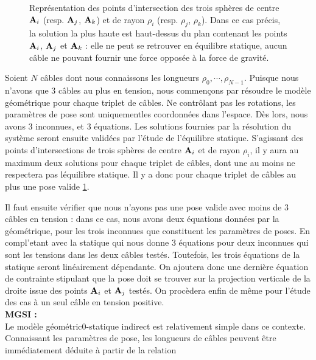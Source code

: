 \begin{figure}[!ht]
  \centering
    \def\svgwidth{.85\linewidth}
      
    \caption{\footnotesize{Repr\'esentation des points d'intersection des 
trois sph\`eres de centre ${\bf A}_i$ (resp. ${\bf A}_j$, ${\bf A}_k$) et de 
rayon $\rho_i$ (resp. $\rho_j$, $\rho_k$). Dans ce cas pr\'ecis, la solution la 
plus haute est haut-dessus du plan contenant les points ${\bf A}_i$, ${\bf 
A}_j$ et ${\bf A}_k$ : elle ne peut se retrouver en \'equilibre statique, 
aucun c\^able ne pouvant fournir une force oppos\'ee \`a la force de 
gravit\'e.}}
\label{intro:fig6b}
\end{figure}

Soient $N$ c\^ables dont nous connaissons les longueurs $\rho_0, \cdots, 
\rho_{N-1}$. Puisque nous n'avons que $3$ c\^ables au plus en tension, nous 
commen\c cons par r\'esoudre le mod\`ele g\'eom\'etrique pour chaque 
triplet de c\^ables. Ne contr\^olant pas les rotations, les param\`etres de 
pose sont uniquementles coordonn\'ees dans l'espace. D\`es lors, nous avons $3$ 
inconnues, et $3$ \'equations. Les solutions fournies par la r\'esolution du 
syst\`eme seront ensuite valid\'ees par l'\'etude de l'\'equilibre statique. 
S'agissant des points d'intersections de trois sph\`eres de centre ${\bf A}_i$ 
et de rayon $\rho_i$, il y aura au maximum deux solutions pour chaque triplet 
de c\^ables, dont une au moins ne respectera pas l\'equilibre statique. Il y a 
donc pour chaque triplet de c\^ables au plus une pose valide \ref{intro:fig6b}.

Il faut ensuite v\'erifier que nous n'ayons pas une pose valide avec moins de 
$3$ c\^ables en tension : dans ce cas, nous avons deux \'equations donn\'ees 
par la g\'eom\'etrique, pour les trois inconnues que constituent les 
param\`etres de poses. En compl'etant avec la statique qui nous donne 3 
\'equations pour deux inconnues qui sont les tensions dans les deux c\^ables 
test\'es. Toutefois, les trois \'equations de la statique seront lin\'eairement 
d\'ependante. On ajoutera donc une derni\`ere \'equation de contrainte 
stipulant que la pose doit se trouver sur la projection verticale de la droite 
issue des points ${\bf A}_i$ et ${\bf A}_j$ test\'es. On proc\`edera enfin de 
m\^eme pour l'\'etude des cas \`a un seul c\^able en tension positive. \\


{\bf MGSI :}\\

Le mod\`ele g\'eom\'etric0-statique indirect est relativement simple dans ce 
contexte. Connaissant les param\`etres de pose, les longueurs de c\^ables 
peuvent \^etre imm\'ediatement d\'eduite \`a partir de la relation 

